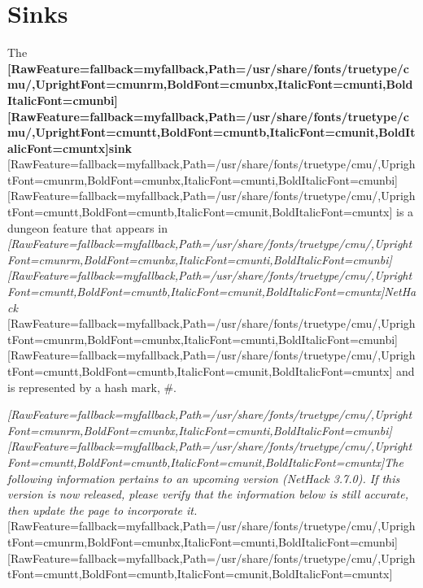 \chapter{Sinks}

The {\bfseries \allowbreak{}\setmainfont{cmunbx.ttf}[RawFeature={fallback=myfallback},Path=/usr/share/fonts/truetype/cmu/,UprightFont=cmunrm,BoldFont=cmunbx,ItalicFont=cmunti,BoldItalicFont=cmunbi]\setmonofont{cmunbx.ttf}[RawFeature={fallback=myfallback},Path=/usr/share/fonts/truetype/cmu/,UprightFont=cmuntt,BoldFont=cmuntb,ItalicFont=cmunit,BoldItalicFont=cmuntx]\bfseries sink}{$\text{ }$}\allowbreak{}\setmainfont{cmunrm.ttf}[RawFeature={fallback=myfallback},Path=/usr/share/fonts/truetype/cmu/,UprightFont=cmunrm,BoldFont=cmunbx,ItalicFont=cmunti,BoldItalicFont=cmunbi]\setmonofont{cmunrm.ttf}[RawFeature={fallback=myfallback},Path=/usr/share/fonts/truetype/cmu/,UprightFont=cmuntt,BoldFont=cmuntb,ItalicFont=cmunit,BoldItalicFont=cmuntx] is a dungeon feature\footnotemark[25] that appears in {\itshape \allowbreak{}\setmainfont{cmunti.ttf}[RawFeature={fallback=myfallback},Path=/usr/share/fonts/truetype/cmu/,UprightFont=cmunrm,BoldFont=cmunbx,ItalicFont=cmunti,BoldItalicFont=cmunbi]\setmonofont{cmunti.ttf}[RawFeature={fallback=myfallback},Path=/usr/share/fonts/truetype/cmu/,UprightFont=cmuntt,BoldFont=cmuntb,ItalicFont=cmunit,BoldItalicFont=cmuntx]\itshape NetHack\footnotemark[26]}{$\text{ }$}\allowbreak{}\setmainfont{cmunrm.ttf}[RawFeature={fallback=myfallback},Path=/usr/share/fonts/truetype/cmu/,UprightFont=cmunrm,BoldFont=cmunbx,ItalicFont=cmunti,BoldItalicFont=cmunbi]\setmonofont{cmunrm.ttf}[RawFeature={fallback=myfallback},Path=/usr/share/fonts/truetype/cmu/,UprightFont=cmuntt,BoldFont=cmuntb,ItalicFont=cmunit,BoldItalicFont=cmuntx] and is represented by a hash mark\footnotemark[27], \#.




{\itshape \allowbreak{}\setmainfont{cmunti.ttf}[RawFeature={fallback=myfallback},Path=/usr/share/fonts/truetype/cmu/,UprightFont=cmunrm,BoldFont=cmunbx,ItalicFont=cmunti,BoldItalicFont=cmunbi]\setmonofont{cmunti.ttf}[RawFeature={fallback=myfallback},Path=/usr/share/fonts/truetype/cmu/,UprightFont=cmuntt,BoldFont=cmuntb,ItalicFont=cmunit,BoldItalicFont=cmuntx]\itshape The following information pertains to an upcoming version (NetHack 3.7.0\footnotemark[28]). If this version is now released, please verify that the information below is still accurate, then update the page to incorporate it.}\allowbreak{}\setmainfont{cmunrm.ttf}[RawFeature={fallback=myfallback},Path=/usr/share/fonts/truetype/cmu/,UprightFont=cmunrm,BoldFont=cmunbx,ItalicFont=cmunti,BoldItalicFont=cmunbi]\setmonofont{cmunrm.ttf}[RawFeature={fallback=myfallback},Path=/usr/share/fonts/truetype/cmu/,UprightFont=cmuntt,BoldFont=cmuntb,ItalicFont=cmunit,BoldItalicFont=cmuntx]




